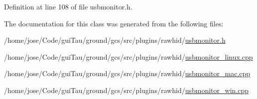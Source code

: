Definition at line 108 of file usbmonitor.\-h.



The documentation for this class was generated from the following files\-:\begin{DoxyCompactItemize}
\item 
/home/jose/\-Code/gui\-Tau/ground/gcs/src/plugins/rawhid/\hyperlink{usbmonitor_8h}{usbmonitor.\-h}\item 
/home/jose/\-Code/gui\-Tau/ground/gcs/src/plugins/rawhid/\hyperlink{usbmonitor__linux_8cpp}{usbmonitor\-\_\-linux.\-cpp}\item 
/home/jose/\-Code/gui\-Tau/ground/gcs/src/plugins/rawhid/\hyperlink{usbmonitor__mac_8cpp}{usbmonitor\-\_\-mac.\-cpp}\item 
/home/jose/\-Code/gui\-Tau/ground/gcs/src/plugins/rawhid/\hyperlink{usbmonitor__win_8cpp}{usbmonitor\-\_\-win.\-cpp}\end{DoxyCompactItemize}
